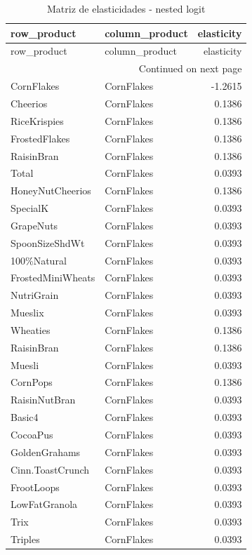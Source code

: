 \scriptsize
\begin{longtable}{llr}
\caption{Matriz de elasticidades - nested logit}\label{tab:elas-nested}\\
\toprule
row_product & column_product & elasticity \\
\midrule
\endfirsthead
\toprule
row_product & column_product & elasticity \\
\midrule
\endhead
\midrule
\multicolumn{3}{r}{Continued on next page} \\
\midrule
\endfoot
\bottomrule
\endlastfoot
CornFlakes & CornFlakes & -1.2615 \\
Cheerios & CornFlakes & 0.1386 \\
RiceKrispies & CornFlakes & 0.1386 \\
FrostedFlakes & CornFlakes & 0.1386 \\
RaisinBran & CornFlakes & 0.1386 \\
Total & CornFlakes & 0.0393 \\
HoneyNutCheerios & CornFlakes & 0.1386 \\
SpecialK & CornFlakes & 0.0393 \\
GrapeNuts & CornFlakes & 0.0393 \\
SpoonSizeShdWt & CornFlakes & 0.0393 \\
100\%Natural & CornFlakes & 0.0393 \\
FrostedMiniWheats & CornFlakes & 0.0393 \\
NutriGrain & CornFlakes & 0.0393 \\
Mueslix & CornFlakes & 0.0393 \\
Wheaties & CornFlakes & 0.1386 \\
RaisinBran & CornFlakes & 0.1386 \\
Muesli & CornFlakes & 0.0393 \\
CornPops & CornFlakes & 0.1386 \\
RaisinNutBran & CornFlakes & 0.0393 \\
Basic4 & CornFlakes & 0.0393 \\
CocoaPus & CornFlakes & 0.0393 \\
GoldenGrahams & CornFlakes & 0.0393 \\
Cinn.ToastCrunch & CornFlakes & 0.0393 \\
FrootLoops & CornFlakes & 0.0393 \\
LowFatGranola & CornFlakes & 0.0393 \\
Trix & CornFlakes & 0.0393 \\
Triples & CornFlakes & 0.0393 \\

\end{longtable}
